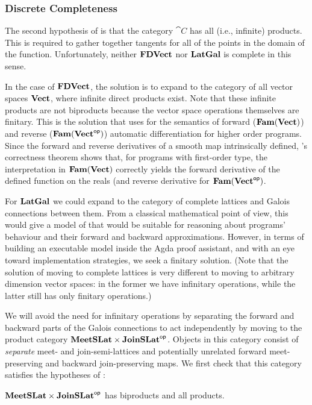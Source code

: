 \subsubsection{Discrete Completeness}

The second hypothesis of  is that the category
$\cat{C}$ has all (i.e., infinite) products. This is required to
gather together tangents for all of the points in the domain of the
function. Unfortunately, neither $\mathbf{FDVect}$ nor $\mathbf{LatGal}$ is complete
in this sense.

In the case of $\mathbf{FDVect}$, the solution is to expand to the category
of all vector spaces $\mathbf{Vect}$, where infinite direct products
exist. Note that these infinite products are not biproducts because
the vector space operations themselves are finitary. This is the
solution that \cite{vakar2021} uses for the semantics of forward
($\mathbf{Fam}(\mathbf{Vect})$) and reverse ($\mathbf{Fam}(\mathbf{Vect}^{\mathsf{op}})$) automatic
differentiation for higher order programs. Since the forward and
reverse derivatives of a smooth map intrinsically defined,
\citet{vakar2021}'s correctness theorem shows that, for programs with
first-order type, the interpretation in $\mathbf{Fam}(\mathbf{Vect})$ correctly yields
the forward derivative of the defined function on the reals (and
reverse derivative for $\mathbf{Fam}(\mathbf{Vect}^{\mathsf{op}})$.

For $\mathbf{LatGal}$ we could expand to the category of complete lattices and
Galois connections between them. From a classical mathematical point
of view, this would give a model of \GPS that would be suitable for
reasoning about programs' behaviour and their forward and backward
approximations. However, in terms of building an executable model
inside the Agda proof assistant, and with an eye toward implementation
strategies, we seek a finitary solution. (Note that the solution of
moving to complete lattices is very different to moving to arbitrary
dimension vector spaces: in the former we have infinitary operations,
while the latter still has only finitary operations.)

We will avoid the need for infinitary operations by separating the
forward and backward parts of the Galois connections to act
independently by moving to the product category
$\mathbf{MeetSLat} \times \mathbf{JoinSLat}^{\mathsf{op}}$. Objects in this category consist of
\emph{separate} meet- and join-semi-lattices and potentially unrelated
forward meet-preserving and backward join-preserving maps. We first
check that this category satisfies the hypotheses of
:

\begin{proposition}
  $\mathbf{MeetSLat} \times \mathbf{JoinSLat}^{\mathsf{op}}$ has biproducts and all products.
\end{proposition}

